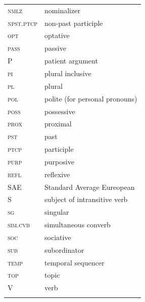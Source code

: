 \documentclass[output=paper,colorlinks,citecolor=brown,
]{langscibook}
\begin{document}
\begin{tabularx}{.44\textwidth}{@{}lQ@{}}
\textsc{nmlz} & nominalizer \\
\textsc{npst.ptcp} & non-past participle \\
\textsc{opt} & optative \\
\textsc{pass} & passive \\
\textsc{P} & patient argument\\
\textsc{pi} & plural inclusive \\
\textsc{pl} & plural \\
\textsc{pol} & polite (for personal pronouns) \\
\textsc{poss} & possessive \\
\textsc{prox} & proximal \\
\textsc{pst} & past \\
\textsc{ptcp} & participle \\
\textsc{purp} & purposive \\
\textsc{refl} & reflexive \\
SAE & Standard Average Eureopean\\
S & subject of intransitive verb\\
\textsc{sg} & singular \\
\textsc{sim.cvb} & simultaneous converb \\
\textsc{soc} & sociative \\
\textsc{sub} & subordinator \\
\textsc{temp} & temporal sequencer \\
\textsc{top} & topic \\
V & verb\\\\
\end{tabularx}




\printbibliography[heading=subbibliography,notkeyword=this]
\end{document}

